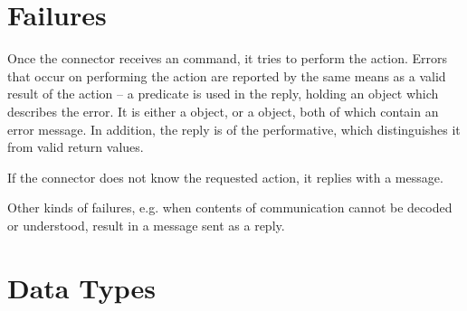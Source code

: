 \section{Failures}

Once the connector receives an  command, it tries to perform the action. Errors that occur on performing the action are reported by the same means as a valid result of the action -- a  predicate is used in the reply, holding an object which describes the error. It is either a  object, or a  object, both of which contain an error message. In addition, the reply is of the  performative, which distinguishes it from valid return values.

If the connector does not know the requested action, it replies with a  message.

Other kinds of failures, e.g. when contents of communication cannot be decoded or understood, result in a  message sent as a reply.


\section{Data Types}

